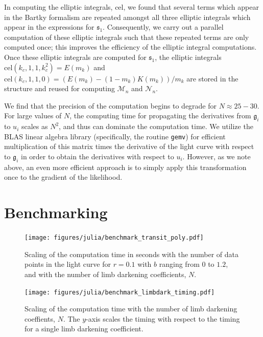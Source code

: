 \documentclass[modern]{aastex61}
\begin{document}
In computing the elliptic integrals, cel, we found that several terms
which appear in the Bartky formalism are repeated amongst all three elliptic
integrals which appear in the expressions for $\mathfrak{s}_1$.  Consequently, we carry
out a parallel computation of these elliptic integrals such that these
repeated terms are only computed once;  this improves the efficiency of
the elliptic integral computations.  Once these elliptic integrals
are computed for $\mathfrak{s}_1$, the elliptic integrals $\mathrm{cel}(k_c,1,1,k_c^2)=E(m_k)$
and $\mathrm{cel}(k_c,1,1,0)=(E(m_k)-(1-m_k)K(m_k))/m_k $ are
stored in the structure and reused for computing $\mathcal{M}_n$
and $\mathcal{N}_n$.

We find that the precision of the computation begins to degrade for
$N \approx 25-30$.  For large values of $N$, the computing time for
propagating the derivatives from $\mathfrak{g}_i$ to $u_i$ scales as $N^2$, and
thus can dominate the computation time.  We utilize the BLAS linear
algebra library (specifically, the routine \texttt{gemv}) for efficient
multiplication of this matrix times the derivative of the light curve with
respect to $\mathfrak{g}_i$ in order to obtain the derivatives with respect to $u_i$.
However, as we note above, an even more efficient approach is to
simply apply this transformation once to the gradient of the likelihood.

\section{Benchmarking}\label{sec:benchmark}

\begin{figure}
    \begin{centering}
    \texttt{[image: figures/julia/benchmark\_transit\_poly.pdf]}
    \caption{Scaling of the computation time in seconds with the number of
    data points in the light curve for $r=0.1$ with $b$ ranging from $0$ to $1.2$,
    and with the number of limb darkening coefficients, $N$. 
    \label{fig:ncoeff}}
    \end{centering}
\end{figure}

\begin{figure}
    \begin{centering}
    \texttt{[image: figures/julia/benchmark\_limbdark\_timing.pdf]}
    \caption{Scaling of the computation time with the number of
    limb darkening coeffients, $N$.  The $y$-axis scales the timing with respect
    to the timing for a single limb darkening coefficient. 
    \label{fig:nlimb}}
    \end{centering}
\end{figure}
\end{document}
